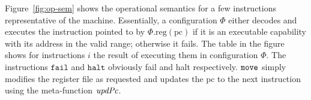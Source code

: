 \documentclass[format=acmsmall, review=true, screen=true]{acmart}
\renewcommand{\figurename}{Figure}
\newcommand{\update}[2]{[#1 \mapsto #2]}
\newcommand{\sem}[1]{\left\llbracket #1 \right\rrbracket}
\newcommand{\var}[1]{\mathit{#1}}
\newcommand{\lv}{\var{r}}
\newcommand{\gl}{\var{g}}
\newcommand{\pcreg}{\mathrm{pc}}
\newcommand{\addr}{\var{a}}
\newcommand{\start}{\var{b}}
\newcommand{\addrend}{\var{e}}
\newcommand{\perm}{\var{perm}}
\newcommand{\permp}{\var{permPair}}
\newcommand{\stdcap}[1][(\perm,\gl)]{\left(#1,\start,\addrend,\addr \right)}
\newcommand{\plainproj}[1]{\mathrm{#1}}
\newcommand{\memreg}[1][\Phi]{#1.\plainproj{reg}}
\newcommand{\updateHeap}[3][\Phi]{#1\update{\plainproj{mem}.#2}{#3}}
\newcommand{\updateReg}[3][\Phi]{#1\update{\plainproj{reg}.#2}{#3}}
\newcommand{\plainfun}[2]{
  \ifthenelse{\equal{#2}{}}
  {\mathit{#1}}
  {\mathit{#1}(#2)}
}
\newcommand{\updatePcPerm}[1]{\plainfun{updPcPerm}{#1}}
\newcommand{\stdUpdatePc}[1]{\plainfun{updPc}{#1}}
\newcommand{\refreg}[1]{#1}
\newcommand{\refheap}[1]{#1}
\newcommand{\zinstr}[1]{\mathtt{#1}}
\newcommand{\fail}{\zinstr{fail}}
\newcommand{\halt}{\zinstr{halt}}
\newcommand{\oneinstr}[2]{
  \ifthenelse{\equal{#2}{}}
  {\zinstr{#1}}
  {\zinstr{#1} \; #2}
}
\newcommand{\jmp}[1]{\oneinstr{jmp}{#1}}
\newcommand{\twoinstr}[3]{
  \ifthenelse{\equal{#2#3}{}}
  {\zinstr{#1}}
  {\zinstr{#1} \; #2 \; #3}
}
\newcommand{\restricttwo}[2]{\twoinstr{restrict}{#1}{#2}}
\newcommand{\geta}[2]{\twoinstr{geta}{#1}{#2}}
\newcommand{\move}[2]{\twoinstr{move}{#1}{#2}}
\newcommand{\store}[2]{\twoinstr{store}{#1}{#2}}
\newcommand{\plainperm}[1]{\textsc{#1}}
\newcommand{\readwrite}{\plainperm{rw}}
\newcommand{\rwx}{\plainperm{rwx}}
\newcommand{\readwritel}{\plainperm{rwl}}
\newcommand{\rwlx}{\plainperm{rwlx}}
\newcommand{\plainlocality}[1]{\mathrm{#1}}
\newcommand{\local}{\plainlocality{local}}
\newcommand{\itoplassug}[1]{}
\begin{document}
\begin{comment}
        \permp'\sqsubseteq \permp } {
        \sem{\restricttwo{\refreg{r_1}}{r_2}}(\Phi) = \\
        \stdUpdatePc{}(\updateReg{r_1}{(\permp',\start,\addrend,\addr)})
      } \and \inferrule{ \memreg(r_2) = ((\_,\_),\_,\_,\addr) } {
        \sem{\geta{\refreg{r_1}}{\refreg{r_2}}}(\Phi) =
        \stdUpdatePc{\updateReg{r_1}{\addr}}} \and \inferrule{
        \var{newPc} = \updatePcPerm{\memreg(\lv)} } {
        \sem{\jmp{\lv}}(\Phi) = \updateReg{\pcreg}{\var{newPc}} } \and
      \inferrule{ \memreg(r_1) = \stdcap\\
        \start \leq \addr \leq \addrend\\
        \perm \in \{ \rwx, \rwlx, \readwrite, \readwritel\}\\
        \var{w} = \memreg(r_2) \\
        \var{w} = ((\_,\local),\_,\_,\_)\Rightarrow\perm \in
        \{\rwlx,\readwritel \} } {
        \sem{\store{\refheap{r_1}}{\refreg{r_2}}}(\Phi) =
        \stdUpdatePc{\updateHeap{\addr}{\var{w}}} } \and
    \end{mathpar}
    \caption{An excerpt from the operational semantics.}
    \label{fig:op-sem}
  \end{figure}
\end{comment}
\figurename~\ref{fig:op-sem}
shows the operational semantics for a few instructions representative of the machine.
Essentially, a configuration $\Phi$ either decodes and executes the instruction pointed to by $\memreg(\pcreg)$ if it is an executable capability with its address in the valid range; otherwise it fails.
The table in the figure shows for instructions $i$ the result of executing them in configuration $\Phi$.
The instructions $\fail$ and $\halt$ obviously fail and halt respectively.
$\move{}{}$ simply modifies the register file as requested and updates the $\pcreg$ to the next instruction using the meta-function $\stdUpdatePc{}$.
\end{document}
